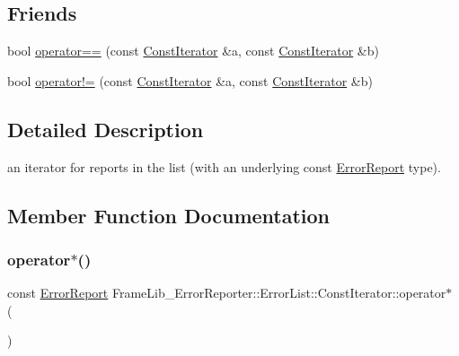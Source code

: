 \subsection*{Friends}
\begin{DoxyCompactItemize}
\item 
bool \hyperlink{class_frame_lib___error_reporter_1_1_error_list_1_1_const_iterator_adaf71c7726f80ad0a7b8046bc2e1db68}{operator==} (const \hyperlink{class_frame_lib___error_reporter_1_1_error_list_1_1_const_iterator}{Const\+Iterator} \&a, const \hyperlink{class_frame_lib___error_reporter_1_1_error_list_1_1_const_iterator}{Const\+Iterator} \&b)
\item 
bool \hyperlink{class_frame_lib___error_reporter_1_1_error_list_1_1_const_iterator_ae2d098d75c9b9d94fed5c416aa4ca0cf}{operator!=} (const \hyperlink{class_frame_lib___error_reporter_1_1_error_list_1_1_const_iterator}{Const\+Iterator} \&a, const \hyperlink{class_frame_lib___error_reporter_1_1_error_list_1_1_const_iterator}{Const\+Iterator} \&b)
\end{DoxyCompactItemize}


\subsection{Detailed Description}
an iterator for reports in the list (with an underlying const \hyperlink{class_frame_lib___error_reporter_1_1_error_report}{Error\+Report} type). 

\subsection{Member Function Documentation}
\mbox{\label{class_frame_lib___error_reporter_1_1_error_list_1_1_const_iterator_a3498bdd49ea2e1368fb811ac516d9e4c}} 
\subsubsection{\texorpdfstring{operator$\ast$()}{operator*()}}
{\footnotesize\ttfamily const \hyperlink{class_frame_lib___error_reporter_1_1_error_report}{Error\+Report} Frame\+Lib\+\_\+\+Error\+Reporter\+::\+Error\+List\+::\+Const\+Iterator\+::operator$\ast$ (\begin{DoxyParamCaption}{ }\end{DoxyParamCaption})\hspace{0.3cm}{\ttfamily [inline]}}

